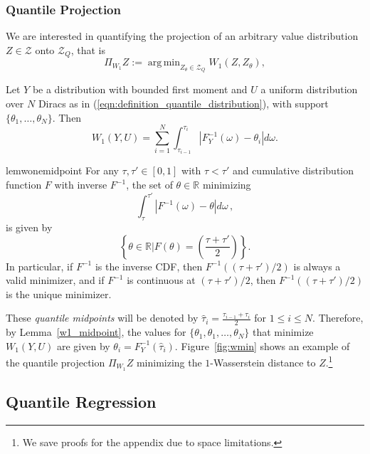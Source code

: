 \documentclass[letterpaper]{article}
\newcommand{\cZ}{\mathcal{Z}}
\DeclareMathOperator*{\argmin}{arg\,min}
\newcommand{\eqnref}[1]{(\ref{eqn:#1})}
\def \qcZ {\cZ_{Q}}
\begin{document}
\subsubsection{Quantile Projection}

We are interested in quantifying the projection of an arbitrary value distribution $Z \in \cZ$ onto $\qcZ$, that is
$$\Pi_{W_1} Z := \argmin_{Z_\theta \in \qcZ} W_1(Z, Z_\theta),$$

Let $Y$ be a distribution with bounded first moment and $U$ a uniform distribution over $N$ Diracs as in \eqnref{definition_quantile_distribution}, with support $\{ \theta_1, \dots, \theta_N \}$. Then
\begin{equation*}
    W_1(Y, U) = \sum_{i=1}^{N} \int_{\tau_{i-1}}^{\tau_{i}} | F_Y^{-1}(\omega) - \theta_i| d\omega.
\end{equation*}
\begin{restatable}{lem}{wonemidpoint}\label{w1_midpoint}
For any $\tau, \tau' \in [0, 1]$ with $\tau < \tau'$ and cumulative distribution function $F$ with inverse $F^{-1}$, the set of $\theta \in \mathbb{R}$ minimizing
\begin{equation*}
    \int_\tau^{\tau'} | F^{-1}(\omega) - \theta | d\omega \, ,
\end{equation*}
is given by
\begin{equation*}
    \left\{\theta \in \mathbb{R} \bigg| F(\theta) = \left(\frac{\tau + \tau'}{2}\right)\right\}.
\end{equation*}
In particular, if $F^{-1}$ is the inverse CDF, then $F^{-1}((\tau+\tau')/2)$ is always a valid minimizer, and if $F^{-1}$ is continuous at $(\tau+\tau')/2$, then $F^{-1}((\tau+\tau')/2)$ is the unique minimizer.
\end{restatable}

These \textit{quantile midpoints} will be denoted by $\hat{\tau}_i = \frac{\tau_{i-1} + \tau_{i}}{2}$ for $1 \le i \le N$.
Therefore, by Lemma~\ref{w1_midpoint}, the values for $\{\theta_1, \theta_1, \ldots, \theta_N\}$ that minimize $W_1(Y, U)$ are given by $\theta_i = F_Y^{-1}(\hat{\tau}_i)$. Figure~\ref{fig:wmin} shows an example of the quantile projection $\Pi_{W_1} Z$ minimizing the $1$-Wasserstein distance to $Z$.\footnote{We save proofs for the appendix due to space limitations.}

\subsection{Quantile Regression}
\end{document}
